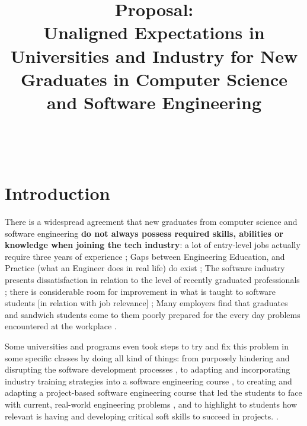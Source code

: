 \documentclass{sigchi}
\begin{document}
\title{Proposal:\\ Unaligned Expectations in Universities and Industry for New Graduates in Computer Science and Software Engineering}

\author{%
  \\
  \\
}

\maketitle

\section*{Introduction}
There is a widespread agreement that new graduates from computer science and software engineering \textbf{do not always possess required skills, abilities or knowledge when joining the tech industry}: a lot of entry-level jobs actually require three years of experience \cite{Chakrabarti2018}; Gaps between Engineering Education, and Practice (what an Engineer does in real life) do exist \cite{Sivanesan2017}; The software industry presents dissatisfaction in relation to the level of recently graduated professionals \cite{Portela2017}; there is considerable room for improvement in what is taught to software students [in relation with job relevance] \cite{Lethbridgea}; Many employers find that graduates and sandwich students come to them poorly prepared for the every day problems encountered at the workplace \cite{Dawson2000}.\newline

Some universities and programs even took steps to try and fix this problem in some specific classes by doing all kind of things: from purposely hindering and disrupting the software development processes \cite{Dawson2000}, to adapting and incorporating industry training strategies into a software engineering course \cite{Portela2017}, to creating and adapting a project-based software engineering course that led the students to face with current, real-world engineering problems \cite{Delgado2017}, and to highlight to students how relevant is having and developing critical soft skills to succeed in projects. \cite{Bastarrica2017}.\newline
\end{document}

